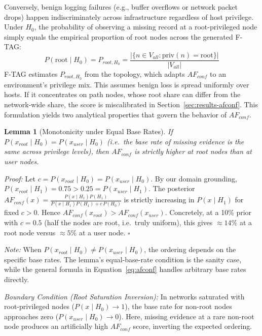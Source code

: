 \documentclass[12pt]{article}
\newtheorem{lemma}{Lemma}
\begin{document}
Conversely, benign logging failures (e.g., buffer overflows or network packet drops) happen indiscriminately across infrastructure regardless of host privilege. Under $H_0$, the probability of observing a missing record at a root-privileged node simply equals the empirical proportion of root nodes across the generated F-TAG:
\begin{equation}\label{eq:base-rate}
P(\text{root} \mid H_0) = P_{root,H_0} = \frac{|\{n \in V_{all} : \text{priv}(n) = \text{root}\}|}{|V_{all}|}
\end{equation}
F-TAG estimates $P_{root,H_0}$ from the topology, which adapts $AF_{conf}$ to an environment's privilege mix. This assumes benign loss is spread uniformly over hosts. If it concentrates on path nodes, whose root share can differ from the network-wide share, the score is miscalibrated in Section~\ref{sec:results-afconf}. This formulation yields two analytical properties that govern the behavior of $AF_{conf}$.

\begin{lemma}[Monotonicity under Equal Base Rates]
If $P(x_{root} \mid H_0) = P(x_{user} \mid H_0)$ (i.e.\ the base rate of missing evidence is the same across privilege levels), then $AF_{conf}$ is strictly higher at root nodes than at user nodes.
\end{lemma}

\textit{Proof:} Let $c = P(x_{root} \mid H_0) = P(x_{user} \mid H_0)$. By our domain grounding, $P(x_{root} \mid H_1) = 0.75 > 0.25 = P(x_{user} \mid H_1)$. The posterior $AF_{conf}(x) = \frac{P(x \mid H_1) P(H_1)}{P(x \mid H_1) P(H_1) + c\, P(H_0)}$ is strictly increasing in $P(x \mid H_1)$ for fixed $c > 0$. Hence $AF_{conf}(x_{root}) > AF_{conf}(x_{user})$. Concretely, at a 10\% prior with $c = 0.5$ (half the nodes are root, i.e.\ truly uniform), this gives $\approx 14\%$ at a root node versus $\approx 5\%$ at a user node. $\square$

\textit{Note:} When $P(x_{root} \mid H_0) \neq P(x_{user} \mid H_0)$, the ordering depends on the specific base rates. The lemma's equal-base-rate condition is the sanity case, while the general formula in Equation~\ref{eq:afconf} handles arbitrary base rates directly.

\textit{Boundary Condition (Root Saturation Inversion):} In networks saturated with root-privileged nodes ($P(x \mid H_0) \to 1$), the base rate for non-root nodes approaches zero ($P(x_{user} \mid H_0) \to 0$). Here, missing evidence at a rare non-root node produces an artificially high $AF_{conf}$ score, inverting the expected ordering.
\end{document}
